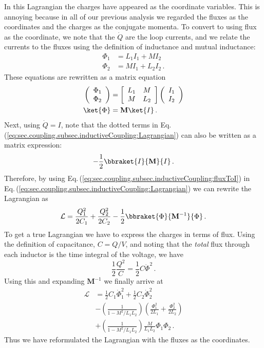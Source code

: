 In this Lagrangian the charges have appeared as the coordinate variables.
This is annoying because in all of our previous analysis we regarded the fluxes as the coordinates and the charges as the conjugate momenta.
To convert to using flux as the coordinate, we note that the $\dot{Q}$ are the loop currents, and we relate the currents to the fluxes using the definition of inductance and mutual inductance:
\begin{align}
\Phi_1 &= L_1 I_1 + M I_2 \\
\Phi_2 &= M I_1 + L_2 I_2 \, .
\end{align}
These equations are rewritten as a matrix equation
\begin{align}
\left( \begin{array}{c} \Phi_1 \\ \Phi_2 \end{array} \right) &=
\left[ \begin{array}{cc} L_1 & M \\ M & L_2 \end{array} \right]
\left( \begin{array}{c} I_1 \\ I_2 \end{array} \right) \\
\ket{\Phi} &= \mathbf{M} \ket{I} \label{eq:sec.coupling.subsec.inductiveCoupling:fluxToI} \, .
\end{align}
Next, using $\dot{Q}=I$, note that the dotted terms in Eq.\,(\ref{eq:sec.coupling.subsec.inductiveCoupling:Lagrangian}) can also be written as a matrix expression:
\begin{equation}
-\frac{1}{2} \bbraket{I}{\mathbf{M}}{I} \, .
\end{equation}
Therefore, by using Eq.\,(\ref{eq:sec.coupling.subsec.inductiveCoupling:fluxToI}) in Eq.\,(\ref{eq:sec.coupling.subsec.inductiveCoupling:Lagrangian}) we can rewrite the Lagrangian as
\begin{equation}
\mathcal{L} =
\frac{Q_1^2}{2 C_1} + \frac{Q_2^2}{2 C_2}
- \frac{1}{2} \bbraket{\Phi}{\mathbf{M}^{-1}}{\Phi} \, .
\end{equation}
To get a true Lagrangian we have to express the charges in terms of flux.
Using the definition of capacitance, $C = Q/V$, and noting that the \emph{total} flux through each inductor is the time integral of the voltage, we have
\begin{equation}
\frac{1}{2}\frac{Q^2}{C} = \frac{1}{2}C \dot{\Phi}^2 \, .
\end{equation}
Using this and expanding $\mathbf{M}^{-1}$ we finally arrive at
\begin{align}
\mathcal{L} &=
\frac{1}{2}C_1 \dot{\Phi}_1^2 + \frac{1}{2}C_2 \dot{\Phi}_2^2 \\
&- \left( \frac{1}{1 - M^2 / L_1L_2} \right)
\left( \frac{\Phi_1^2}{2L_1} + \frac{\Phi_2^2}{2L_2} \right) \\
&+ \left( \frac{1}{1 - M^2 / L_1 L_2} \right) \frac{M}{L_1 L_2} \Phi_1 \Phi_2 \, .
\end{align}
Thus we have reformulated the Lagrangian with the fluxes as the coordinates.

